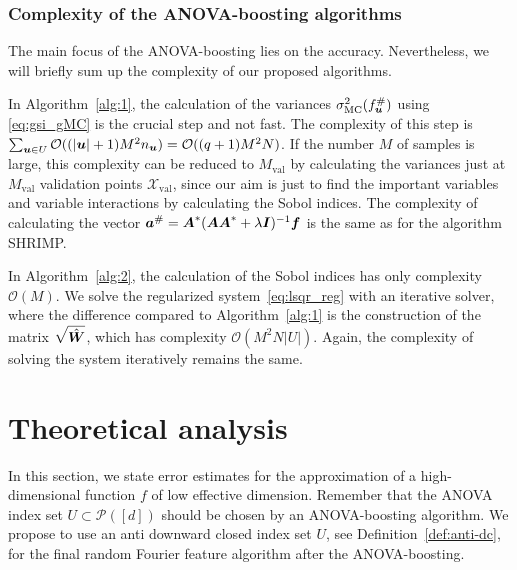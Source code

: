 \documentclass{article}
\renewcommand{\vec}[1]{\ensuremath \mathbf{\boldsymbol{#1}}}
\newcommand{\X}{\ensuremath{\mathcal{X}}}
\renewcommand{\O}{\ensuremath{\mathcal{O}}}
\theoremstyle{definition}
\numberwithin{equation}{section}
\begin{document}
\subsubsection*{Complexity of the ANOVA-boosting algorithms}
The main focus of the ANOVA-boosting lies on the accuracy. Nevertheless, we will briefly sum up the complexity of our proposed algorithms.\par
In Algorithm~\ref{alg:1}, the calculation of the variances $\sigma^2_{\text{MC}}( f^\#_{\vec u})$ using \eqref{eq:gsi_gMC} is the crucial step and not fast. The complexity of this step is $\sum_{\vec u\in U} \O((|\vec u|+1)M^2n_{\vec u}) = \O((q+1)M^2N)$. If the number $M$ of samples is large, this complexity can be reduced to $M_{\text{val}}$ by calculating the variances just at $M_{\text{val}}$ validation points $\X_{\text{val}}$, since our aim is just to find the important variables and variable interactions by calculating the Sobol indices. The complexity of calculating the vector $\vec a^\# = \vec A^* (\vec A\vec A^*+ \lambda \vec I)^{-1}\vec f$ is the same as for the algorithm SHRIMP. \par
In Algorithm~\ref{alg:2}, the calculation of the Sobol indices 
has only complexity $\O(M)$. We solve the regularized system~\eqref{eq:lsqr_reg} 
with an iterative solver, where the difference compared to Algorithm~\ref{alg:1} 
is the construction of the matrix $\sqrt{ \hat{\vec W}}$, which has complexity 
$\mathcal O(M^2N|U|)$. Again, the complexity of solving the system iteratively 
remains the same.

\section{Theoretical analysis}\label{sec:theory}
In this section, we state error estimates for the approximation of a high-dimensional function $f$ of low effective dimension. Remember that the ANOVA index set $U \subset \mathcal P([d])$ should be chosen by an ANOVA-boosting algorithm. We propose to use an anti downward closed index set $U$, see Definition~\ref{def:anti-dc}, for the final random Fourier feature algorithm after the ANOVA-boosting.
\end{document}
